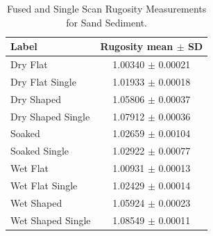 \begin{table}[ht]
	\centering
	\small
	\setlength{\tabcolsep}{8pt}
	\caption{Fused and Single Scan Rugosity Measurements for Sand Sediment.}
	\label{tab:Sand_Rugosity}
	\begin{tabular}{l c}
		\toprule
		Label & \makecell{Rugosity\\{\footnotesize mean $\pm$ SD}} \\
		\midrule
		Dry Flat & 1.00340 $\pm$ 0.00021 \\
		Dry Flat Single & 1.01933 $\pm$ 0.00018 \\
		Dry Shaped & 1.05806 $\pm$ 0.00037 \\
		Dry Shaped Single & 1.07912 $\pm$ 0.00036 \\
		Soaked & 1.02659 $\pm$ 0.00104 \\
		Soaked Single & 1.02922 $\pm$ 0.00077 \\
		Wet Flat & 1.00931 $\pm$ 0.00013 \\
		Wet Flat Single & 1.02429 $\pm$ 0.00014 \\
		Wet Shaped & 1.05924 $\pm$ 0.00023 \\
		Wet Shaped Single & 1.08549 $\pm$ 0.00011 \\
		\bottomrule
	\end{tabular}
\end{table}
